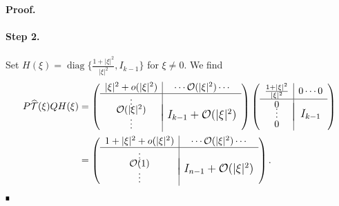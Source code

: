 \documentclass[letterpaper,11pt]{article}
\newcommand{\rmO}{\mathcal{O}}
\newcommand{\That}{\widehat{\mathcal{T}}}
\newcommand{\diag}{\operatorname{diag}}
\numberwithin{equation}{section}
\theoremstyle{plain}
\theoremstyle{remark}
\newenvironment{Proof}[1][.]%
 {\begin{trivlist}\item[]\textbf{Proof#1 }}%
 {\hspace*{\fill}$\rule{0.3\baselineskip}{0.35\baselineskip}$\end{trivlist}}
\begin{document}
\begin{Proof}



\paragraph{Step 2.} Set $
H(\xi) = \diag\{\frac{1+|\xi|^2}{|\xi|^2}, I_{k-1}\}$ for $\xi \neq 0$. 
We find
\begin{align*}
P\That(\xi)QH(\xi) &= \left(
\begin{array}{c|c}
  |\xi|^2+o(|\xi|^2) &  \cdots \rmO(|\xi|^2)\cdots \\ \hline
  \vdots & \raisebox{-10pt}{{\large\mbox{{$I_{k-1}+\rmO(|\xi|^2)$}}}} \\[-4ex]
  \rmO(|\xi|^2) & \\[-0.5ex]
  \vdots &
\end{array}\right)\left(
\begin{array}{c|c}
  \frac{1+|\xi|^2}{|\xi|^2} & 0 \cdots 0 \\ \hline
  0 & \raisebox{-10pt}{{\large\mbox{{$I_{k-1}$}}}} \\[-4ex]
  \vdots & \\[-0.5ex]
  0 &
\end{array}\right)\\
&= \left(
\begin{array}{c|c}
  1+|\xi|^2+o(|\xi|^2) &  \cdots \rmO(|\xi|^2)\cdots \\ \hline
  \vdots & \raisebox{-10pt}{{\large\mbox{{$I_{n-1}+\rmO(|\xi|^2)$}}}} \\[-4ex]
  \rmO(1) & \\[-0.5ex]
  \vdots &
\end{array}\right) .
\end{align*} 


\end{Proof}
\end{document}
